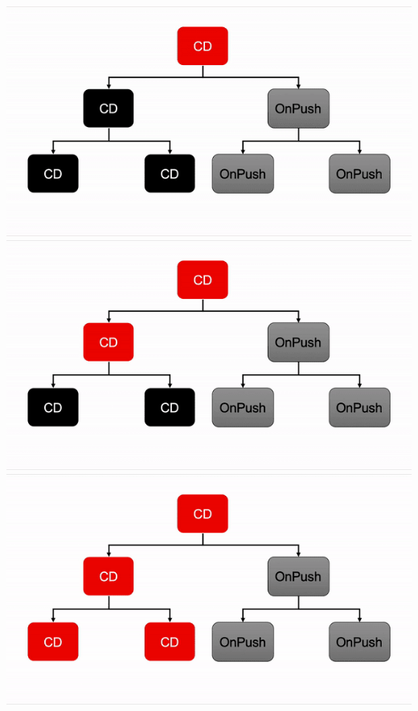 \begin{enumerate}
	\includegraphics[width=\linewidth]{onpush-cycle2.png}
	\includegraphics[width=\linewidth]{onpush-cycle3.png}
	\includegraphics[width=\linewidth]{onpush-cycle4.png}
\autocite{Hoffmann2019}
\end{enumerate}
	
